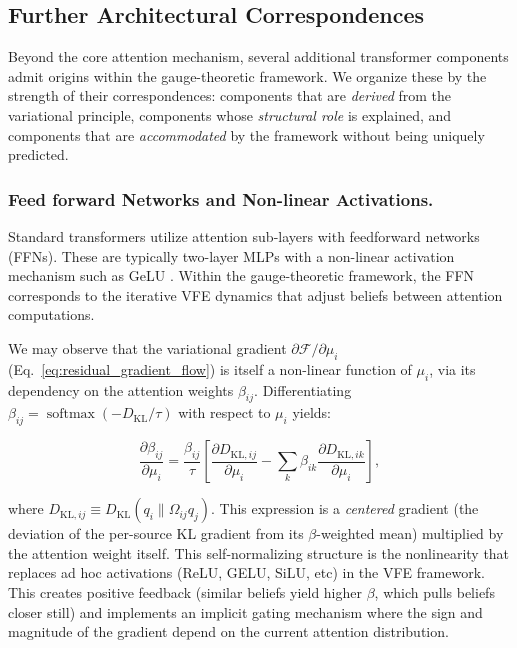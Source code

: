 \documentclass[twoside,11pt]{article}
\begin{document}
\subsection{Further Architectural Correspondences}
\label{sec:further_correspondences}

Beyond the core attention mechanism, several additional transformer components admit origins within the gauge-theoretic framework. We organize these by the strength of their correspondences: components that are \emph{derived} from the variational principle, components whose \emph{structural role} is explained, and components that are \emph{accommodated} by the framework without being uniquely predicted.

\subsubsection{Feed forward Networks and Non-linear Activations.}
\label{sec:ffn_nonlinearity}

Standard transformers utilize attention sub-layers with feedforward networks (FFNs). These are typically two-layer MLPs with a non-linear activation mechanism such as GeLU \citep{hendrycks2016gaussian}. Within the gauge-theoretic framework, the FFN corresponds to the iterative VFE dynamics that adjust beliefs between attention computations.

We may observe that the variational gradient $\partial \mathcal{F}/\partial \mu_i$ (Eq.~\ref{eq:residual_gradient_flow}) is itself a non-linear function of $\mu_i$, via its dependency on the attention weights $\beta_{ij}$. Differentiating $\beta_{ij} = \operatorname{softmax}(-D_{\mathrm{KL}}/\tau)$ with respect to $\mu_i$ yields:

\begin{equation}
\frac{\partial \beta_{ij}}{\partial \mu_i} = \frac{\beta_{ij}}{\tau}\left[\frac{\partial D_{\mathrm{KL},ij}}{\partial \mu_i} - \sum_k \beta_{ik} \frac{\partial D_{\mathrm{KL},ik}}{\partial \mu_i}\right],
\label{eq:softmax_gradient_nonlinearity}
\end{equation}

where $D_{\mathrm{KL},ij} \equiv D_{\mathrm{KL}}(q_i \| \Omega_{ij} q_j)$. This expression is a \emph{centered} gradient (the deviation of the per-source KL gradient from its $\beta$-weighted mean) multiplied by the attention weight itself. This self-normalizing structure is the nonlinearity that replaces ad hoc activations (ReLU, GELU, SiLU, etc) in the VFE framework. This creates positive feedback (similar beliefs yield higher $\beta$, which pulls beliefs closer still) and implements an implicit gating mechanism where the sign and magnitude of the gradient depend on the current attention distribution.
\end{document}
